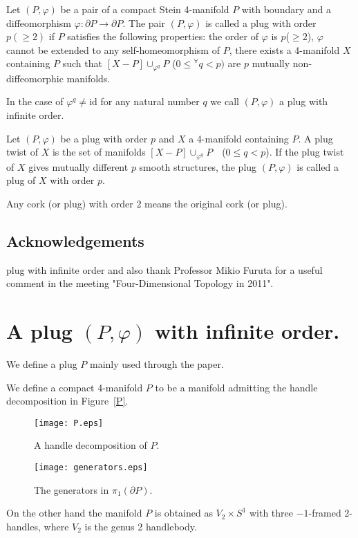 \documentclass[11pt]{amsart}
\begin{document}
\begin{defi}
Let $(P,\varphi)$ be a pair of a compact Stein 4-manifold $P$ with boundary and a diffeomorphism $\varphi:\partial P\to \partial P$.
The pair $(P,\varphi)$ is called a plug with order $p(\ge 2)$ if $P$ satisfies the following properties:
the order of $\varphi$ is $p$($\ge 2$), $\varphi$ cannot be extended to any self-homeomorphism of $P$,
there exists a 4-manifold $X$ containing $P$ such that $[X-P]\cup_{\varphi^q}P$ ($0\le {}^{\forall}q< p)$ are
$p$ mutually non-diffeomorphic manifolds.

In the case of $\varphi^q\neq$id for any natural number $q$ we call $(P,\varphi)$ a plug with infinite order.

Let $(P,\varphi)$ be a plug with order $p$ and $X$ a 4-manifold
containing $P$.
A plug twist of $X$ is the set of manifolds $[X-P]\cup_{\varphi^q} P$\ \ ($0\le  q< p$).
If the plug twist of $X$ gives mutually different $p$ smooth structures,
the plug $(P,\varphi)$ is called a plug of $X$ with order $p$.
\end{defi}
Any cork (or plug) with order $2$ means the original cork (or plug).

\subsection{Acknowledgements}
plug with infinite order and also thank Professor Mikio Furuta for a useful comment in the meeting "Four-Dimensional Topology in 2011".

\section{A plug $(P,\varphi)$ with infinite order.}
We define a plug $P$ mainly used through the paper.
\begin{defi}
\label{defin}
We define a compact 4-manifold $P$ to be a manifold admitting the handle decomposition in Figure~\ref{P}.
\end{defi}
\begin{figure}[ht]
\begin{minipage}{.495\hsize}
\begin{center}
\texttt{[image: P.eps]}
\caption{A handle decomposition of $P$.}
\label{P}
\end{center}
\end{minipage}
\begin{minipage}{.495\hsize}
\begin{center}
\texttt{[image: generators.eps]}
\caption{The generators in $\pi_1(\partial P)$.}
\label{gene}
\end{center}
\end{minipage}
\end{figure}
On the other hand the manifold $P$ is obtained as $V_2\times S^1$ with three $-1$-framed 2-handles,
where $V_2$ is the genus 2 handlebody.
\end{document}
